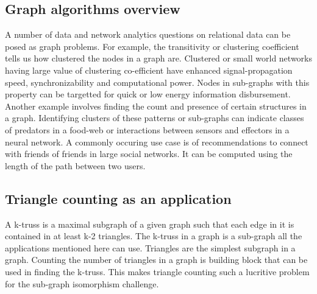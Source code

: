 \subsection{Graph algorithms overview}
A number of data and network analytics questions on relational data can be posed as graph problems. For example, the transitivity or clustering coefficient tells us how clustered the nodes in a graph are. Clustered or small world networks having large value of clustering co-efficient have enhanced signal-propagation speed, synchronizability and computational power\cite{b1}. Nodes in sub-graphs with this property can be targetted for quick or low energy information disbursement. Another example involves finding the count and presence of certain structures in a graph. Identifying clusters of these patterns\cite{b2} or sub-graphs can indicate classes of predators in a food-web or interactions between sensors and effectors in a neural network\cite{b3}. A commonly occuring use case is of recommendations to connect with friends of friends in large social networks. It can be computed using the length of the path between two users\cite{b4}.
\subsection{Triangle counting as an application}
A k-truss is a maximal subgraph of a given graph such that each edge in it is contained in at least k-2 triangles. The k-truss in a graph is a sub-graph all the applications mentioned here can use. Triangles are the simplest subgraph in a graph. Counting the number of triangles in a graph is building block that can be used in finding the k-truss\cite{b5}. This makes triangle counting such a lucritive problem for the sub-graph isomorphism challenge\cite{b6}.
